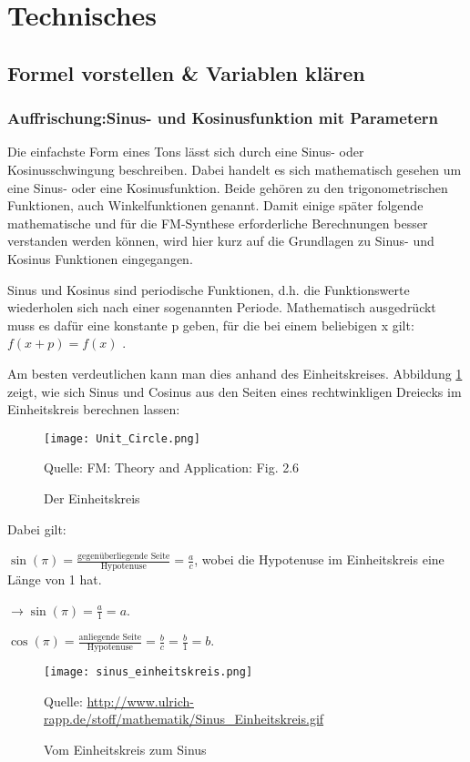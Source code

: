 \section{Technisches}

\subsection{Formel vorstellen \& Variablen klären}
\subsubsection{Auffrischung:Sinus- und Kosinusfunktion mit Parametern}
Die einfachste Form eines Tons lässt sich durch eine Sinus- oder Kosinusschwingung beschreiben. Dabei handelt es sich mathematisch gesehen um eine Sinus- oder eine Kosinusfunktion. Beide gehören zu den trigonometrischen Funktionen, auch Winkelfunktionen genannt. Damit einige später folgende mathematische und für die FM-Synthese erforderliche Berechnungen besser verstanden werden können, wird hier kurz auf die Grundlagen zu Sinus- und Kosinus Funktionen eingegangen. 

Sinus und Kosinus sind periodische Funktionen, d.h. die Funktionswerte wiederholen sich nach einer sogenannten Periode. Mathematisch ausgedrückt muss es dafür eine konstante p  geben, für die bei einem beliebigen x gilt: $f(x + p) =  f(x)$ .

Am besten verdeutlichen kann man dies anhand des Einheitskreises. Abbildung \ref{fig:unitcircle} zeigt, wie sich Sinus und Cosinus aus den Seiten eines rechtwinkligen Dreiecks im Einheitskreis berechnen lassen:

\begin{figure} [ht]
\centering
\texttt{[image: Unit\_Circle.png]}
\caption{Der Einheitskreis}
\label{fig:unitcircle}
Quelle: FM: Theory and Application: Fig. 2.6
\end{figure}

Dabei gilt: 

$\sin(\pi) = \frac{\text{gegenüberliegende Seite}}{\text{Hypotenuse}} = \frac{a}{c}$, wobei die Hypotenuse im Einheitskreis eine Länge von 1 hat. 

$\to\sin(\pi) = \frac{a}{1} = a$.

$\cos(\pi) = \frac{\text{anliegende Seite}}{\text{Hypotenuse}} = \frac{b}{c} = \frac{b}{1} = b$.

\begin{figure} [ht]
\centering
\texttt{[image: sinus\_einheitskreis.png]}
\caption{Vom Einheitskreis zum Sinus}
\label{fig:unitcircleToSinus}
Quelle: \url{http://www.ulrich-rapp.de/stoff/mathematik/Sinus_Einheitskreis.gif}
\end{figure}


